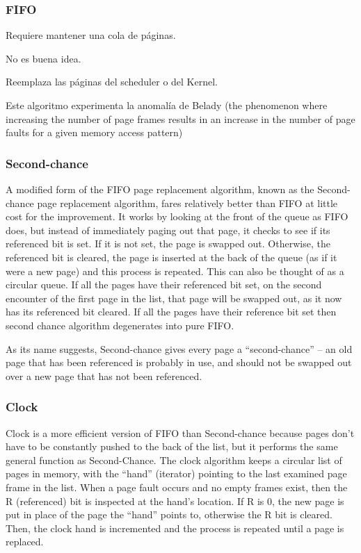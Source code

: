 \documentclass[a4paper, twoside]{article}
\begin{document}
\subsubsection{FIFO}
Requiere mantener una cola de páginas.

No es buena idea.

Reemplaza las páginas del scheduler o del Kernel.

Este algoritmo experimenta la anomalía de Belady (the phenomenon where increasing the number of page frames results in an increase in the number of page faults for a given memory access pattern)

\subsubsection{Second-chance}
A modified form of the FIFO page replacement algorithm, known as the Second-chance page replacement algorithm, fares relatively better than FIFO at little cost for the improvement. It works by looking at the front of the queue as FIFO does, but instead of immediately paging out that page, it checks to see if its referenced bit is set. If it is not set, the page is swapped out. Otherwise, the referenced bit is cleared, the page is inserted at the back of the queue (as if it were a new page) and this process is repeated. This can also be thought of as a circular queue. If all the pages have their referenced bit set, on the second encounter of the first page in the list, that page will be swapped out, as it now has its referenced bit cleared. If all the pages have their reference bit set then second chance algorithm degenerates into pure FIFO.

As its name suggests, Second-chance gives every page a ``second-chance'' – an old page that has been referenced is probably in use, and should not be swapped out over a new page that has not been referenced.

\subsubsection{Clock}
Clock is a more efficient version of FIFO than Second-chance because pages don't have to be constantly pushed to the back of the list, but it performs the same general function as Second-Chance. The clock algorithm keeps a circular list of pages in memory, with the ``hand'' (iterator) pointing to the last examined page frame in the list. When a page fault occurs and no empty frames exist, then the R (referenced) bit is inspected at the hand's location. If R is 0, the new page is put in place of the page the ``hand'' points to, otherwise the R bit is cleared. Then, the clock hand is incremented and the process is repeated until a page is replaced.
\end{document}
